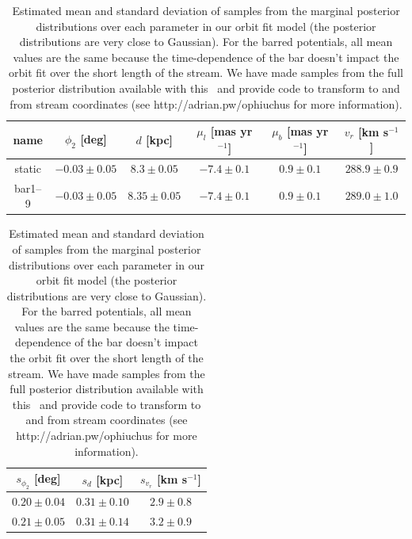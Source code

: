 \begin{table}[ht]
\footnotesize
\begin{center}
	\begin{tabular}{cccccc}
	\toprule
	name & $\phi_2$ [deg] & $d$ [kpc] & $\mu_l$ [mas yr$^{-1}$] & $\mu_b$ [mas yr$^{-1}$] & $v_r$ [km s$^{-1}$]\\\midrule
	static & $-0.03\pm0.05$ & $8.3\pm0.05$ & $-7.4\pm0.1$ & $0.9\pm0.1$ & $288.9\pm0.9$\\
	bar1--9 & $-0.03\pm0.05$ & $8.35\pm0.05$ & $-7.4\pm0.1$ & $0.9\pm0.1$ & $289.0\pm1.0$\\
	\bottomrule
	\end{tabular}

	\begin{tabular}{ccc}
	\toprule
	$s_{\phi_2}$ [deg] & $s_{d}$ [kpc] & $s_{v_r}$ [km s$^{-1}$]\\\midrule
	$0.20\pm0.04$ & $0.31\pm0.10$ & $2.9\pm0.8$\\
	$0.21\pm0.05$ & $0.31\pm0.14$ & $3.2\pm0.9$\\
	\bottomrule
	\end{tabular}
	\caption{Estimated mean and standard deviation of samples from the marginal
	posterior distributions over each parameter in our orbit fit model (the
	posterior distributions are very close to Gaussian). For the barred
	potentials, all mean values are the same because the time-dependence of the
	bar doesn't impact the orbit fit over the short length of the stream. We
	have made samples from the full posterior distribution available with this
	\article\ and provide code to transform to and from stream coordinates (see
	http://adrian.pw/ophiuchus for more information).\label{tbl:param-means} }
\end{center}
\end{table}

